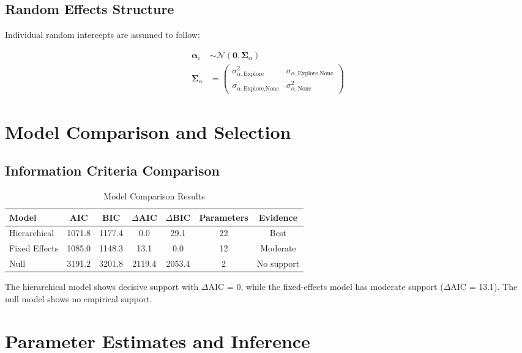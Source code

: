 \documentclass[11pt,a4paper]{article}
\begin{document}
\subsection{Random Effects Structure}

Individual random intercepts are assumed to follow:

\begin{align}
\boldsymbol{\alpha}_i &\sim \mathcal{N}(\boldsymbol{0}, \boldsymbol{\Sigma}_\alpha) \\
\boldsymbol{\Sigma}_\alpha &= \begin{pmatrix}
\sigma_{\alpha,\text{Explore}}^2 & \sigma_{\alpha,\text{Explore,None}} \\
\sigma_{\alpha,\text{Explore,None}} & \sigma_{\alpha,\text{None}}^2
\end{pmatrix}
\end{align}

\section{Model Comparison and Selection}

\subsection{Information Criteria Comparison}

\begin{table}[H]
\centering
\caption{Model Comparison Results}
\begin{tabular}{lcccccc}
\toprule
\textbf{Model} & \textbf{AIC} & \textbf{BIC} & \textbf{$\Delta$AIC} & \textbf{$\Delta$BIC} & \textbf{Parameters} & \textbf{Evidence} \\
\midrule
Hierarchical & 1071.8 & 1177.4 & 0.0 & 29.1 & 22 & Best \\
Fixed Effects & 1085.0 & 1148.3 & 13.1 & 0.0 & 12 & Moderate \\
Null & 3191.2 & 3201.8 & 2119.4 & 2053.4 & 2 & No support \\
\bottomrule
\end{tabular}
\end{table}

The hierarchical model shows decisive support with $\Delta$AIC = 0, while the fixed-effects model has moderate support ($\Delta$AIC = 13.1). The null model shows no empirical support.

\section{Parameter Estimates and Inference}
\end{document}
